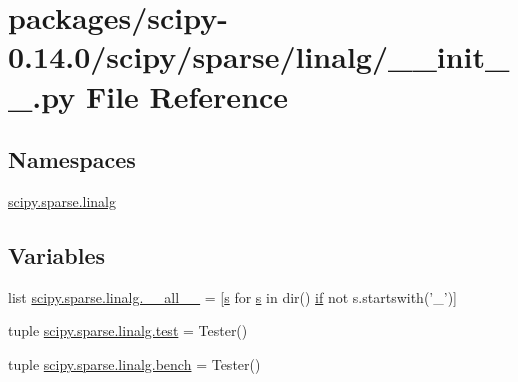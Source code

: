 \hypertarget{packages_2scipy-0_814_80_2scipy_2sparse_2linalg_2____init_____8py}{}\section{packages/scipy-\/0.14.0/scipy/sparse/linalg/\+\_\+\+\_\+init\+\_\+\+\_\+.py File Reference}
\label{packages_2scipy-0_814_80_2scipy_2sparse_2linalg_2____init_____8py}
\subsection*{Namespaces}
\begin{DoxyCompactItemize}
\item 
 \hyperlink{namespacescipy_1_1sparse_1_1linalg}{scipy.\+sparse.\+linalg}
\end{DoxyCompactItemize}
\subsection*{Variables}
\begin{DoxyCompactItemize}
\item 
list \hyperlink{namespacescipy_1_1sparse_1_1linalg_a847b0785b69df93bf6d9be6995ec41fe}{scipy.\+sparse.\+linalg.\+\_\+\+\_\+all\+\_\+\+\_\+} = \mbox{[}\hyperlink{indexexpr_8h_ae024b0db549122b44c349ae28ec990dc}{s} for \hyperlink{indexexpr_8h_ae024b0db549122b44c349ae28ec990dc}{s} in dir() \hyperlink{minmax_8h_a30a0ee9fee303f01d9c5e6f669e0dfe9}{if} not s.\+startswith('\+\_\+')\mbox{]}
\item 
tuple \hyperlink{namespacescipy_1_1sparse_1_1linalg_a9abd810c68cd7b171e52e0bcdec26007}{scipy.\+sparse.\+linalg.\+test} = Tester()
\item 
tuple \hyperlink{namespacescipy_1_1sparse_1_1linalg_ad7af8cc0f32f0c3ad9aa9a5146ead92e}{scipy.\+sparse.\+linalg.\+bench} = Tester()
\end{DoxyCompactItemize}
